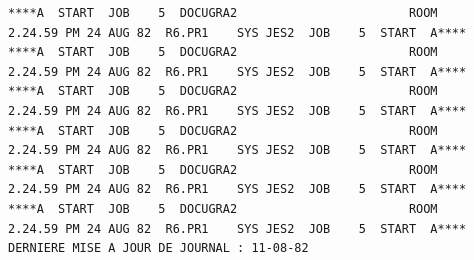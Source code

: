 {\fontsize{4}{5}\selectfont
\begin{verbatim}
****A  START  JOB    5  DOCUGRA2                        ROOM        2.24.59 PM 24 AUG 82  R6.PR1    SYS JES2  JOB    5  START  A****
****A  START  JOB    5  DOCUGRA2                        ROOM        2.24.59 PM 24 AUG 82  R6.PR1    SYS JES2  JOB    5  START  A****
****A  START  JOB    5  DOCUGRA2                        ROOM        2.24.59 PM 24 AUG 82  R6.PR1    SYS JES2  JOB    5  START  A****
****A  START  JOB    5  DOCUGRA2                        ROOM        2.24.59 PM 24 AUG 82  R6.PR1    SYS JES2  JOB    5  START  A****
****A  START  JOB    5  DOCUGRA2                        ROOM        2.24.59 PM 24 AUG 82  R6.PR1    SYS JES2  JOB    5  START  A****
****A  START  JOB    5  DOCUGRA2                        ROOM        2.24.59 PM 24 AUG 82  R6.PR1    SYS JES2  JOB    5  START  A****
DERNIERE MISE A JOUR DE JOURNAL : 11-08-82
\end{verbatim}
}
